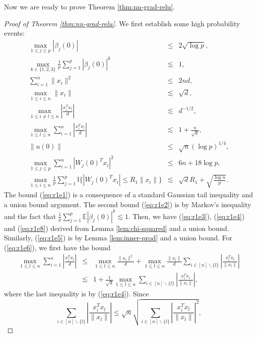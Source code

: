Now we are ready to prove Theorem \ref{thm:nn-grad-relu}.
\begin{proof}[Proof of Theorem \ref{thm:nn-grad-relu}]
We first establish some high probability events:
\begin{eqnarray}
\label{eq:r1e1} \max_{1\leq j\leq p}|\beta_j(0)| &\leq& 2\sqrt{\log p}, \\
\label{eq:r1e2} \max_{k\in\{1,2,3\}}\frac{1}{p}\sum_{j=1}^p|\beta_j(0)|^k &\lesssim& 1, \\
\label{eq:r1e3} \sum_{i=1}^n\|x_i\|^2 &\leq& 2nd, \\
\label{eq:r1e4} \max_{1\leq i\leq n}\|x_i\| &\lesssim& \sqrt{d}, \\
\label{eq:r1e5} \max_{1\leq i\neq l\leq n}\left|\frac{x_i^Tx_l}{d}\right| &\lesssim& d^{-1/2}, \\
\label{eq:r1e6}\max_{1\leq l\leq n}\sum_{i=1}^n\left|\frac{x_i^Tx_l}{d}\right| &\lesssim& 1+\frac{n}{\sqrt{d}}, \\
 \label{eq:r1e7}\|u(0)\| &\leq& \sqrt{n}(\log p)^{1/4}, \\
 \label{eq:r1e8}\max_{1\leq j\leq p}\sum_{i=1}^n|W_j(0)^Tx_i|^2 &\leq& 6n+18\log p, \\
 \label{eq:r1e9}\max_{1\leq i\leq n}\frac{1}{p}\sum_{j=1}^p\mathbb{I}\{|W_j(0)^Tx_i|\leq R_1\|x_i\|\} &\lesssim& \sqrt{d}R_1 + \sqrt{\frac{\log n}{p}}.
\end{eqnarray}
The bound (\ref{eq:r1e1}) is a consequence of a standard Gaussian tail inequality and a union bound argument. The second bound (\ref{eq:r1e2}) is by Markov's inequality and the fact that $\frac{1}{p}\sum_{j=1}^p\mathbb{E}|\beta_j(0)|^k\lesssim 1$. Then, we have (\ref{eq:r1e3}), (\ref{eq:r1e4}) and (\ref{eq:r1e8}) derived from Lemma \ref{lem:chi-squared} and a union bound. Similarly, (\ref{eq:r1e5}) is by Lemma \ref{lem:inner-prod} and a union bound. For (\ref{eq:r1e6}), we first have the bound
\begin{eqnarray*}
\max_{1\leq l\leq n}\sum_{i=1}^n\left|\frac{x_i^Tx_l}{d}\right| &\leq& \max_{1\leq l\leq n}\frac{\|x_l\|^2}{d} + \max_{1\leq l\leq n}\frac{\|x_l\|}{d}\sum_{i\in[n]\backslash\{l\}}\left|\frac{x_i^Tx_l}{\|x_l\|}\right| \\
&\lesssim&  1 + \frac{1}{\sqrt{d}}\max_{1\leq l\leq n}\sum_{i\in[n]\backslash\{l\}}\left|\frac{x_i^Tx_l}{\|x_l\|}\right|,
\end{eqnarray*}
where the last inequality is by (\ref{eq:r1e4}). Since
$$\sum_{i\in[n]\backslash\{l\}}\left|\frac{x_i^Tx_l}{\|x_l\|}\right|\leq \sqrt{n}\sqrt{\sum_{i\in[n]\backslash\{l\}}\left|\frac{x_i^Tx_l}{\|x_l\|}\right|^2},$$

\end{proof}
